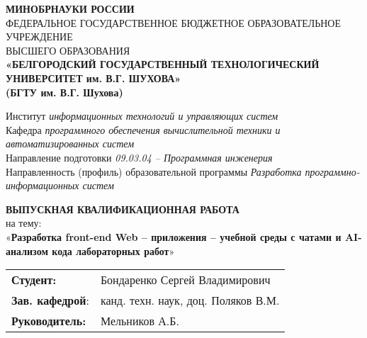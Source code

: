 
\newcommand{\No}{\textnumero}








\begin{titlepage}
    \centering
    {\small \textbf{МИНОБРНАУКИ РОССИИ}}\\
    {\small ФЕДЕРАЛЬНОЕ ГОСУДАРСТВЕННОЕ БЮДЖЕТНОЕ ОБРАЗОВАТЕЛЬНОЕ УЧРЕЖДЕНИЕ}\\
    {\small ВЫСШЕГО ОБРАЗОВАНИЯ}\\
    \textbf{
    «БЕЛГОРОДСКИЙ ГОСУДАРСТВЕННЫЙ ТЕХНОЛОГИЧЕСКИЙ \\
    УНИВЕРСИТЕТ им. В.Г. ШУХОВА» \\
    (БГТУ им. В.Г. Шухова) \\
    }
    
    \vfill %
    
    \raggedright
    Институт \textit{информационных технологий и управляющих систем}\\
    Кафедра \textit{программного обеспечения вычислительной техники и автоматизированных систем}\\
    Направление подготовки \textit{09.03.04 – Программная инженерия}\\
    Направленность (профиль) образовательной программы \textit{Разработка программно-информационных систем}
    
    \centering
    \vfill
    
    \textbf{ВЫПУСКНАЯ КВАЛИФИКАЦИОННАЯ РАБОТА}\\
    {\large на тему:\\[1ex]
    «\textbf{Разработка front-end Web – приложения – учебной среды с чатами и AI-анализом кода лабораторных работ}»}
    
    \vfill %
    
    \raggedright
    \begin{tabular}{@{} l l @{}}
        \textbf{Студент:}       & Бондаренко Сергей Владимирович \\
        \textbf{Зав. кафедрой}: & канд. техн. наук, доц. Поляков В.М. \\
        \textbf{Руководитель:}  & Мельников А.Б.
    \end{tabular}
    

\end{titlepage}
